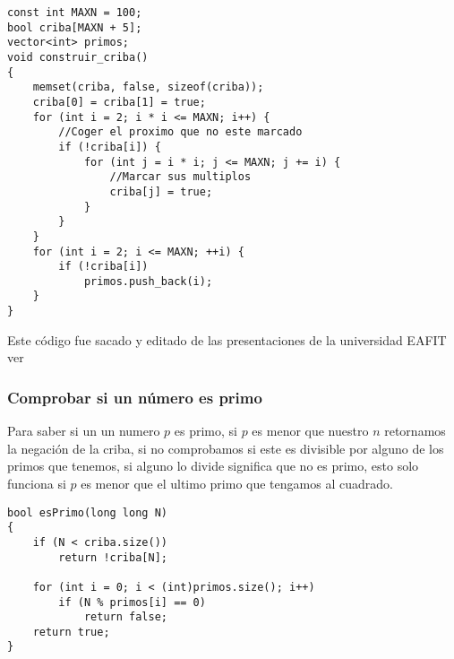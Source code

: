 \begin{lstlisting}[style=C,caption=criba.cpp]
const int MAXN = 100;
bool criba[MAXN + 5];
vector<int> primos;
void construir_criba()
{
    memset(criba, false, sizeof(criba));
    criba[0] = criba[1] = true;
    for (int i = 2; i * i <= MAXN; i++) {
        //Coger el proximo que no este marcado
        if (!criba[i]) {
            for (int j = i * i; j <= MAXN; j += i) {
                //Marcar sus multiplos
                criba[j] = true;
            }
        }
    }
    for (int i = 2; i <= MAXN; ++i) {
        if (!criba[i])
            primos.push_back(i);
    }
}
\end{lstlisting}
Este código fue sacado y editado de las presentaciones de la universidad EAFIT ver \cite{SemilleroProgramacion:Online}

\subsubsection{Comprobar si un número es primo}
Para saber si un un numero $p$ es primo, si $p$ es menor  que nuestro $n$ retornamos la negación de la criba, si no comprobamos si este es divisible por alguno de los primos que tenemos, si alguno lo divide significa que no es primo, esto solo  funciona si $p$ es menor que el ultimo primo que tengamos al cuadrado.
\begin{minipage}{\textwidth}
\begin{lstlisting}[style=C,caption=criba.cpp]
bool esPrimo(long long N)
{
    if (N < criba.size())
        return !criba[N];

    for (int i = 0; i < (int)primos.size(); i++)
        if (N % primos[i] == 0)
            return false;
    return true;
}
\end{lstlisting}
\end{minipage}

